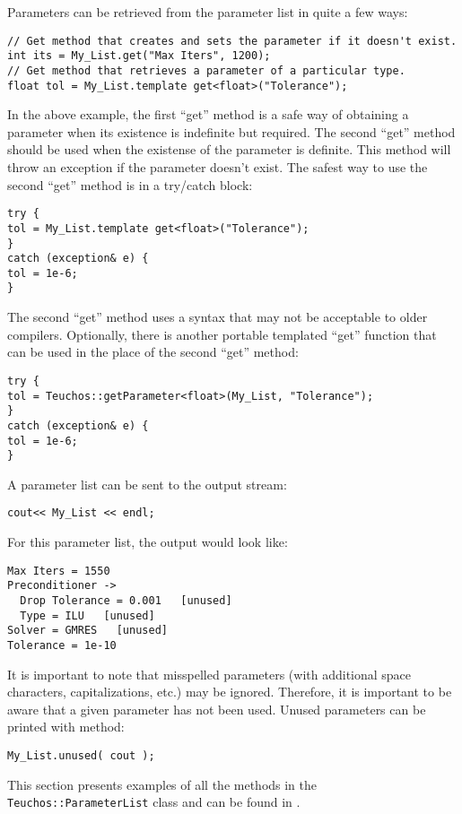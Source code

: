Parameters can be retrieved from the parameter list in quite a few ways:
{\small
\begin{verbatim}
// Get method that creates and sets the parameter if it doesn't exist.
int its = My_List.get("Max Iters", 1200);
// Get method that retrieves a parameter of a particular type.
float tol = My_List.template get<float>("Tolerance");
\end{verbatim}}
\noindent In the above example, the first ``get'' method is a safe way of
obtaining a parameter when its existence is indefinite but required.
The second ``get'' method should be used when the existense of the parameter
is definite.  This method will throw an exception if the parameter doesn't exist. 
The safest way to use the second ``get'' method
is in a try/catch block:
{\small
\begin{verbatim}
try {
tol = My_List.template get<float>("Tolerance");
}
catch (exception& e) {
tol = 1e-6;
}
\end{verbatim}}
\noindent The second ``get'' method uses a syntax that may not be
acceptable to older compilers.  Optionally, there is another portable templated 
``get'' function that can be used in the place of the second ``get'' method:
{\small
\begin{verbatim}
try {
tol = Teuchos::getParameter<float>(My_List, "Tolerance");
}
catch (exception& e) {
tol = 1e-6;
}
\end{verbatim}}

A parameter list can be sent to the output stream:
{\small
\begin{verbatim}
cout<< My_List << endl;
\end{verbatim}}
\noindent For this parameter list, the output would look like:
{\small
\begin{verbatim}
Max Iters = 1550
Preconditioner ->
  Drop Tolerance = 0.001   [unused]
  Type = ILU   [unused]
Solver = GMRES   [unused]
Tolerance = 1e-10
\end{verbatim}}
\noindent It is important to note that misspelled parameters 
(with additional space characters, capitalizations, etc.) may be ignored.  
Therefore, it is important to be aware that a given parameter has not been used. 
Unused parameters can be printed with method:
{\small
\begin{verbatim}
My_List.unused( cout );
\end{verbatim}}
This section presents examples of all the methods in the 
{\tt Teuchos::ParameterList} class and can be found in
.  

